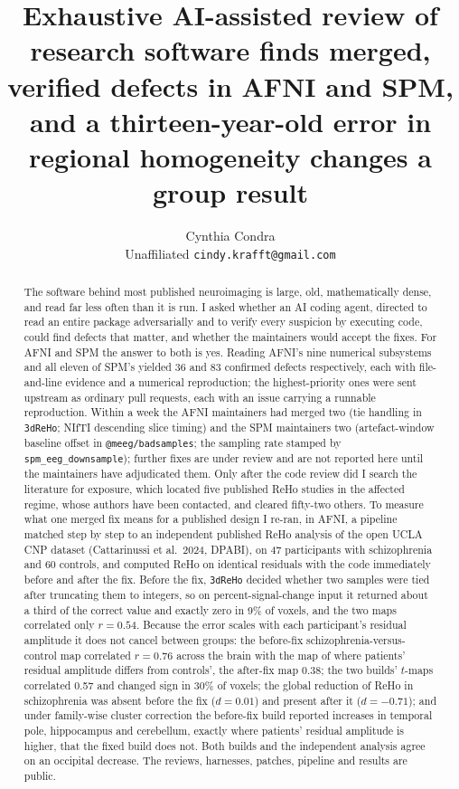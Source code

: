 \documentclass[11pt]{article}
\title{\textbf{Exhaustive AI-assisted review of research software finds merged, verified defects in AFNI and SPM,\\ and a thirteen-year-old error in regional homogeneity changes a group result}}
\author{Cynthia Condra\\ \small Unaffiliated \quad \texttt{cindy.krafft@gmail.com}}
\newcommand{\code}[1]{\texttt{#1}}
\begin{document}
\maketitle

\begin{abstract}
The software behind most published neuroimaging is large, old, mathematically dense, and read far less often than it is run. I asked whether an AI coding agent, directed to read an entire package adversarially and to verify every suspicion by executing code, could find defects that matter, and whether the maintainers would accept the fixes. For AFNI and SPM the answer to both is yes. Reading AFNI's nine numerical subsystems and all eleven of SPM's yielded 36 and 83 confirmed defects respectively, each with file-and-line evidence and a numerical reproduction; the highest-priority ones were sent upstream as ordinary pull requests, each with an issue carrying a runnable reproduction. Within a week the AFNI maintainers had merged two (tie handling in \code{3dReHo}; NIfTI descending slice timing) and the SPM maintainers two (artefact-window baseline offset in \code{@meeg/badsamples}; the sampling rate stamped by \code{spm\_eeg\_downsample}); further fixes are under review and are not reported here until the maintainers have adjudicated them. Only after the code review did I search the literature for exposure, which located five published ReHo studies in the affected regime, whose authors have been contacted, and cleared fifty-two others. To measure what one merged fix means for a published design I re-ran, in AFNI, a pipeline matched step by step to an independent published ReHo analysis of the open UCLA CNP dataset (Cattarinussi et al.\ 2024, DPABI), on 47 participants with schizophrenia and 60 controls, and computed ReHo on identical residuals with the code immediately before and after the fix. Before the fix, \code{3dReHo} decided whether two samples were tied after truncating them to integers, so on percent-signal-change input it returned about a third of the correct value and exactly zero in 9\% of voxels, and the two maps correlated only $r = 0.54$. Because the error scales with each participant's residual amplitude it does not cancel between groups: the before-fix schizophrenia-versus-control map correlated $r = 0.76$ across the brain with the map of where patients' residual amplitude differs from controls', the after-fix map $0.38$; the two builds' $t$-maps correlated 0.57 and changed sign in 30\% of voxels; the global reduction of ReHo in schizophrenia was absent before the fix ($d = 0.01$) and present after it ($d = -0.71$); and under family-wise cluster correction the before-fix build reported increases in temporal pole, hippocampus and cerebellum, exactly where patients' residual amplitude is higher, that the fixed build does not. Both builds and the independent analysis agree on an occipital decrease. The reviews, harnesses, patches, pipeline and results are public.
\end{abstract}
\end{document}
